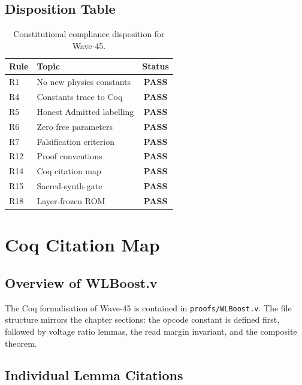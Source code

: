 \subsection{Disposition Table}

\begin{table}[htbp]
  \centering
  \caption{Constitutional compliance disposition for Wave-45.}
  \label{tab:constitutional}
  \begin{tabular}{llc}
    \hline
    \textbf{Rule} & \textbf{Topic} & \textbf{Status} \\
    \hline
    R1  & No new physics constants         & \textbf{PASS} \\
    R4  & Constants trace to Coq           & \textbf{PASS} \\
    R5  & Honest Admitted labelling        & \textbf{PASS} \\
    R6  & Zero free parameters             & \textbf{PASS} \\
    R7  & Falsification criterion          & \textbf{PASS} \\
    R12 & Proof conventions                & \textbf{PASS} \\
    R14 & Coq citation map                 & \textbf{PASS} \\
    R15 & Sacred-synth-gate                & \textbf{PASS} \\
    R18 & Layer-frozen ROM                 & \textbf{PASS} \\
    \hline
  \end{tabular}
\end{table}

\section{Coq Citation Map}
\label{sec:wlboost-coq}

\subsection{Overview of WLBoost.v}

The Coq formalisation of Wave-45 is contained in
\texttt{proofs/WLBoost.v}.  The file structure mirrors the chapter
sections: the opcode constant is defined first, followed by voltage
ratio lemmas, the read margin invariant, and the composite theorem.

\subsection{Individual Lemma Citations}

